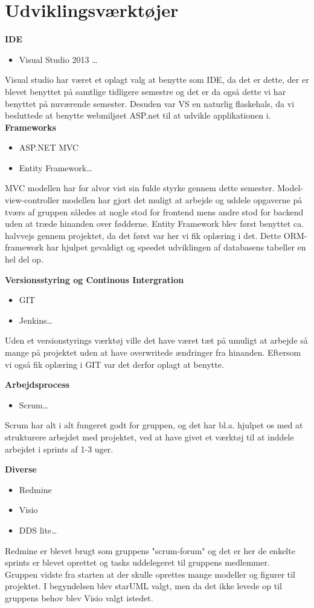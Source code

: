 \section{Udviklingsværktøjer} 


\textbf{IDE}
\begin{itemize}
  \item Visual Studio 2013 \ldots
\end{itemize}
Visual studio har været et oplagt valg at benytte som IDE, da det er dette, der er blevet benyttet på samtlige tidligere semestre og det er da også dette vi har benyttet på nuværende semester. Desuden var VS en naturlig flaskehals, da vi besluttede at benytte webmiljøet ASP.net til at udvikle applikationen i. \\


\textbf{Frameworks} 
\begin{itemize}
  \item ASP.NET MVC
  \item Entity Framework\ldots
\end{itemize}
MVC modellen har for alvor vist sin fulde styrke gennem dette semester. Model-view-controller modellen har gjort det muligt at arbejde og uddele opgaverne på tværs af gruppen således at nogle stod for frontend mens andre stod for backend uden at træde hinanden over fødderne.
Entity Framework blev først benyttet ca. halvvejs gennem projektet, da det først var her vi fik oplæring i det. Dette ORM-framework har hjulpet gevaldigt og speedet udviklingen af databasens tabeller en hel del op.  

\textbf{Versionsstyring og Continous Intergration} 
\begin{itemize}
  \item GIT
  \item Jenkins\ldots
\end{itemize}
Uden et versionstyrings værktøj ville det have været tæt på umuligt at arbejde så mange på projektet uden at have overwritede ændringer fra hinanden. Eftersom vi også fik oplæring i GIT var det derfor oplagt at benytte.


\textbf{Arbejdsprocess} 
\begin{itemize}
  \item Scrum\ldots
\end{itemize}
Scrum har alt i alt fungeret godt for gruppen, og det har bl.a. hjulpet os med at strukturere arbejdet med projektet, ved at have givet et værktøj til at inddele arbejdet i sprints af 1-3 uger. 


\textbf{Diverse} 
\begin{itemize}
  \item Redmine
  \item Visio
  \item DDS lite\ldots
\end{itemize}
Redmine er blevet brugt som gruppens "scrum-forum" og det er her de enkelte sprints er blevet oprettet og tasks uddelegeret til gruppens medlemmer. \\
Gruppen vidste fra starten at der skulle oprettes mange modeller og figurer til projektet. I begyndelsen blev starUML valgt, men da det ikke levede op til gruppens behov blev Visio valgt istedet.
